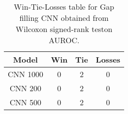 \begin{table}[H]
\centering
\begin{tabular}{|c|c|c|c|}

\textbf{Model} &  \textbf{Win} &  \textbf{Tie} &  \textbf{Losses} \\
\hline

      CNN 1000 &             0 &             2 &                0 \\
\hline
       CNN 200 &             0 &             2 &                0 \\
\hline
       CNN 500 &             0 &             2 &                0 \\
\hline

\end{tabular}
\caption{Win-Tie-Losses table for Gap filling CNN obtained from Wilcoxon signed-rank teston AUROC.}
\label{tab:gap_filling_cnn_model_comparison}
\end{table}